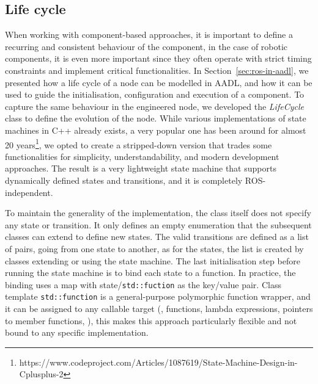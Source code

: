 \subsection{Life cycle}
When working with component-based approaches, it is important to define a recurring and consistent behaviour of the component, in the case of robotic components, it is even more important since they often operate with strict timing constraints and implement critical functionalities. In Section~\ref{sec:ros-in-aadl}, we presented how a life cycle of a node can be modelled in AADL, and how it can be used to guide the initialisation, configuration and execution of a component. To capture the same behaviour in the engineered node, we developed the \textit{LifeCycle} class to define the evolution of the node. While various implementations of state machines in C++ already exists, a very popular one has been around for almost 20 years\footnote{https://www.codeproject.com/Articles/1087619/State-Machine-Design-in-Cplusplus-2}, we opted to create a stripped-down version that trades some functionalities for simplicity, understandability, and modern development approaches. The result is a very lightweight state machine that supports dynamically defined states and transitions, and it is completely ROS-independent.

To maintain the generality of the implementation, the class itself does not specify any state or transition. It only defines an empty enumeration that the subsequent classes can extend to define new states. The valid transitions are defined as a list of pairs, going from one state to another, as for the states, the list is created by classes extending or using the state machine. The last initialisation step before running the state machine is to bind each state to a function. In practice, the binding uses a map with state/\texttt{std::fuction} as the key/value pair. Class template \texttt{std::function} is a general-purpose polymorphic function wrapper, and it can be assigned to any callable target (\eg, functions, lambda expressions, pointers to member functions, \etc), this makes this approach particularly flexible and not bound to any specific implementation. 

